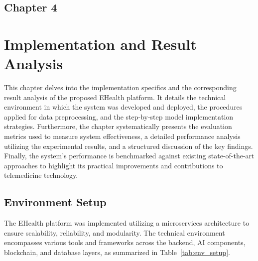 \begin{center}
    \section*{\fontsize{20}{20}\selectfont Chapter 4}
\end{center}
\vspace{10mm}

\section{Implementation and Result Analysis}
This chapter delves into the implementation specifics and the corresponding result analysis of the proposed EHealth platform. It details the technical environment in which the system was developed and deployed, the procedures applied for data preprocessing, and the step-by-step model implementation strategies. Furthermore, the chapter systematically presents the evaluation metrics used to measure system effectiveness, a detailed performance analysis utilizing the experimental results, and a structured discussion of the key findings. Finally, the system's performance is benchmarked against existing state-of-the-art approaches to highlight its practical improvements and contributions to telemedicine technology.

\subsection{Environment Setup}
The EHealth platform was implemented utilizing a microservices architecture to ensure scalability, reliability, and modularity. The technical environment encompasses various tools and frameworks across the backend, AI components, blockchain, and database layers, as summarized in Table~\ref{tab:env_setup}.

